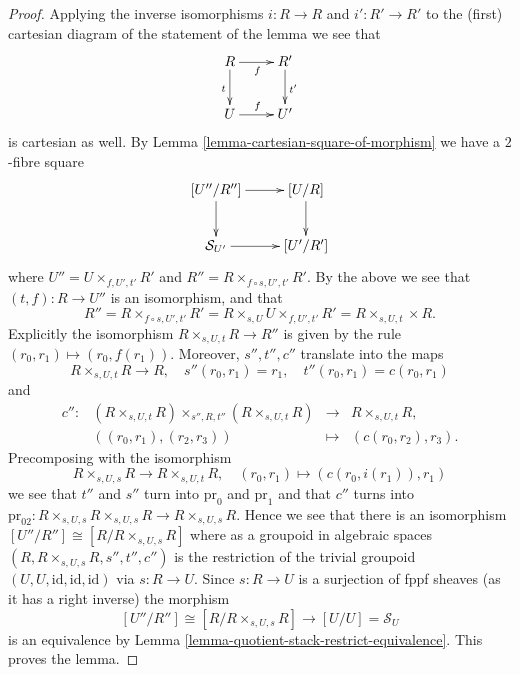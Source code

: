 \documentclass[10pt,a4paper]{amsart}
\theoremstyle{plain}
\theoremstyle{definition}
\theoremstyle{remark}
\numberwithin{equation}{subsection}
\begin{document}
\begin{proof}
Applying the inverse isomorphisms $i : R \to R$ and $i' : R' \to R'$
to the (first) cartesian diagram of the statement of the lemma we see
that
$$
\xymatrix{
R \ar[d]_t \ar[r]_f & R' \ar[d]^{t'} \\
U \ar[r]^f & U'
}
$$
is cartesian as well. By
Lemma \ref{lemma-cartesian-square-of-morphism}
we have a $2$-fibre square
$$
\xymatrix{
[U''/R''] \ar[d] \ar[r] & [U/R] \ar[d] \\
\mathcal{S}_{U'} \ar[r] & [U'/R']
}
$$
where $U'' = U \times_{f, U', t'} R'$ and
$R'' = R \times_{f \circ s, U', t'} R'$. By the above
we see that $(t, f) : R \to U''$ is an isomorphism, and that
$$
R'' =
R \times_{f \circ s, U', t'} R' =
R \times_{s, U} U \times_{f, U', t'} R' =
R \times_{s, U, t} \times R.
$$
Explicitly the isomorphism $R \times_{s, U, t} R \to R''$ is given by
the rule $(r_0, r_1) \mapsto (r_0, f(r_1))$.
Moreover, $s'', t'', c''$ translate into the maps
$$
R \times_{s, U, t} R \to R,
\quad
s''(r_0, r_1) = r_1, \quad t''(r_0, r_1) = c(r_0, r_1)
$$
and
$$
\begin{matrix}
c'' : &
(R \times_{s, U, t} R) \times_{s'', R, t''} (R \times_{s, U, t} R)
&
\longrightarrow
&
R \times_{s, U, t} R, \\
&
((r_0, r_1), (r_2, r_3)) &
\longmapsto & (c(r_0, r_2), r_3).
\end{matrix}
$$
Precomposing with the isomorphism
$$
R \times_{s, U, s} R \longrightarrow R \times_{s, U, t} R,
\quad
(r_0, r_1) \longmapsto (c(r_0, i(r_1)), r_1)
$$
we see that $t''$ and $s''$ turn into
$\text{pr}_0$ and $\text{pr}_1$ and that $c''$ turns into
$\text{pr}_{02} :
R \times_{s, U, s} R \times_{s, U, s} R \to R \times_{s, U, s} R$.
Hence we see that there is an isomorphism
$[U''/R''] \cong [R/R \times_{s, U, s} R]$ where as a groupoid
in algebraic spaces $(R, R \times_{s, U, s} R, s'', t'', c'')$
is the restriction of the trivial groupoid
$(U, U, \text{id}, \text{id}, \text{id})$ via $s : R \to U$.
Since $s : R \to U$ is a surjection of fppf sheaves (as it has a
right inverse) the morphism
$$
[U''/R''] \cong [R/R \times_{s, U, s} R]
\longrightarrow
[U/U] = \mathcal{S}_U
$$
is an equivalence by
Lemma \ref{lemma-quotient-stack-restrict-equivalence}.
This proves the lemma.
\end{proof}
\end{document}
